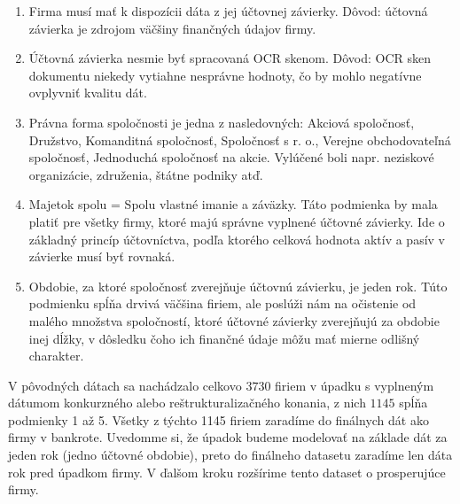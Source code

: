 \begin{enumerate}
    \item Firma musí mať k dispozícii dáta z jej účtovnej závierky. Dôvod: účtovná závierka je zdrojom väčšiny finančných údajov firmy.
    \item Účtovná závierka nesmie byť spracovaná OCR skenom. Dôvod: OCR sken dokumentu niekedy vytiahne nesprávne hodnoty, čo by mohlo negatívne ovplyvniť kvalitu dát.
    \item Právna forma spoločnosti je jedna z nasledovných: Akciová spoločnosť, Družstvo, Komanditná spoločnosť, Spoločnosť s r. o., Verejne obchodovateľná spoločnosť, Jednoduchá spoločnosť na akcie. Vylúčené boli napr. neziskové organizácie, združenia, štátne podniky atď.
    \item Majetok spolu = Spolu vlastné imanie a záväzky. Táto podmienka by mala platiť pre všetky firmy, ktoré majú správne vyplnené účtovné závierky. Ide o základný princíp účtovníctva, podľa ktorého celková hodnota aktív a pasív v závierke musí byť rovnaká.
    \item Obdobie, za ktoré spoločnosť zverejňuje účtovnú závierku, je jeden rok. Túto podmienku spĺňa drvivá väčšina firiem, ale poslúži nám na očistenie od malého množstva spoločností, ktoré účtovné závierky zverejňujú za obdobie inej dĺžky, v dôsledku čoho ich finančné údaje môžu mať mierne odlišný charakter.
\end{enumerate}

V pôvodných dátach sa nachádzalo celkovo \(3730\) firiem v úpadku s vyplneným dátumom konkurzného alebo reštrukturalizačného konania, z nich \(1145\) spĺňa podmienky 1 až 5.
Všetky z týchto 1145 firiem zaradíme do finálnych dát ako firmy v bankrote.
Uvedomme si, že úpadok budeme modelovať na základe dát za jeden rok (jedno účtovné obdobie), preto do finálneho datasetu zaradíme len dáta rok pred úpadkom firmy.
V ďalšom kroku rozšírime tento dataset o prosperujúce firmy.

